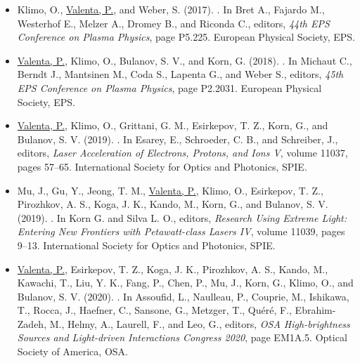 \documentclass[10pt, a4paper, twoside, openright]{report}
\newcommand{\link}[3][blue]{\href{#2}{\color{#1}{#3}}}%
\begin{document}
\begin{itemize}
	
	\renewcommand{\labelitemi}{\tiny$\blacksquare$}
	
	\item Klimo, O., \underline{Valenta, P.}, and Weber, S. (2017). \link{http://ocs.ciemat.es/EPS2017PAP/pdf/P5.225.pdf}{Laser absorption and ion acceleration under tight-focusing conditions}. In Bret A., Fajardo M., Westerhof E., Melzer A., Dromey B., and Riconda C., editors, \textit{44th EPS Conference on Plasma Physics}, page P5.225. European Physical Society, EPS.
	
	\item \underline{Valenta, P.}, Klimo, O., Bulanov, S. V., and Korn, G. (2018). \link{http://ocs.ciemat.es/EPS2018PAP/pdf/P2.2031.pdf}{On high-quality electron beam generated by breaking wake wave in near-critical density plasmas}. In Michaut C., Berndt J., Mantsinen M., Coda S., Lapenta G., and Weber S., editors, \textit{45th EPS Conference on Plasma Physics}, page P2.2031. European Physical Society, EPS.
	
	\item \underline{Valenta, P.}, Klimo, O., Grittani, G. M., Esirkepov, T. Z., Korn, G., and Bulanov, S. V. (2019). \link{https://doi.org/10.1117/12.2521040}{Wakefield excited by ultrashort laser pulses in near-critical density plasmas}. In Esarey, E., Schroeder, C. B., and Schreiber, J., editors, \textit{Laser Acceleration of Electrons, Protons, and Ions V}, volume 11037, pages 57--65. International Society for Optics and Photonics, SPIE.
	
	\item Mu, J., Gu, Y., Jeong, T. M., \underline{Valenta, P.}, Klimo, O., Esirkepov, T. Z., Pirozhkov, A. S., Koga, J. K., Kando, M., Korn, G., and Bulanov, S. V. (2019). \link{https://doi.org/10.1117/12.2524653}{High order harmonics generation via laser reflection at electron density peaks}. In Korn G. and Silva L. O., editors, \textit{Research Using Extreme Light: Entering New Frontiers with Petawatt-class Lasers IV}, volume 11039, pages 9--13. International Society for Optics and Photonics, SPIE.
	
	\item \underline{Valenta, P.}, Esirkepov, T. Z., Koga, J. K., Pirozhkov, A. S., Kando, M., Kawachi, T., Liu, Y. K., Fang, P., Chen, P., Mu, J., Korn, G., Klimo, O., and Bulanov, S. V. (2020). \link{https://doi.org/10.1364/EUVXRAY.2020.EM1A.5}{Relativistic flying mirrors as a compact source of coherent short-wavelength radiation}. In Assoufid, L., Naulleau, P., Couprie, M., Ishikawa, T., Rocca, J., Haefner, C., Sansone, G., Metzger, T., Quéré, F., Ebrahim-Zadeh, M., Helmy, A., Laurell, F., and Leo, G., editors, \textit{OSA High-brightness Sources and Light-driven Interactions Congress 2020}, page EM1A.5. Optical Society of America, OSA.
	

\end{itemize}
\end{document}
